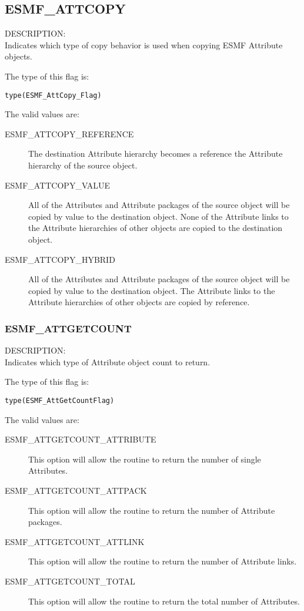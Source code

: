 
\subsection{ESMF\_ATTCOPY}
\label{const:attcopy}
{\sf DESCRIPTION:\\}
Indicates which type of copy behavior is used when copying ESMF Attribute objects.

The type of this flag is:

{\tt type(ESMF\_AttCopy\_Flag)}

The valid values are:
\begin{description}
  \item[ESMF\_ATTCOPY\_REFERENCE]
    The destination Attribute hierarchy becomes a reference
    the Attribute hierarchy of the source object.
  \item[ESMF\_ATTCOPY\_VALUE]
    All of the Attributes and Attribute packages of the source object will be
    copied by value to the destination object. None of the Attribute links to
    the Attribute hierarchies of other objects are copied to the
    destination object.
  \item[ESMF\_ATTCOPY\_HYBRID]
    All of the Attributes and Attribute packages of the source object will be
    copied by value to the destination object. The Attribute links to the
    Attribute hierarchies of other objects are copied by reference.
\end{description}

\subsubsection{ESMF\_ATTGETCOUNT}
\label{const:attgetcount}

{\sf DESCRIPTION:\\}
Indicates which type of Attribute object count to return.

The type of this flag is:

{\tt type(ESMF\_AttGetCountFlag)}

The valid values are:
\begin{description}
	\item[ESMF\_ATTGETCOUNT\_ATTRIBUTE]
	This option will allow the routine to return the number of single Attributes.
	\item[ESMF\_ATTGETCOUNT\_ATTPACK]
	This option will allow the routine to return the number of Attribute packages.
	\item[ESMF\_ATTGETCOUNT\_ATTLINK]
	This option will allow the routine to return the number of Attribute links.
	\item[ESMF\_ATTGETCOUNT\_TOTAL]
	This option will allow the routine to return the total number of Attributes.
\end{description}

